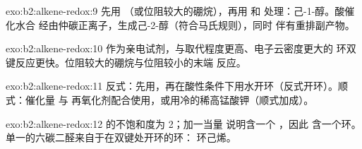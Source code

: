 \begin{solution}{exo:b2:alkene-redox:9}
先用 （或位阻较大的硼烷），再用  和  处理：己-1-醇。酸催化水合
经由仲碳正离子，生成己-2-醇（符合马氏规则），同时
伴有重排副产物。
\end{solution}

\begin{solution}{exo:b2:alkene-redox:10}
作为亲电试剂，与取代程度更高、电子云密度更大的
环双键反应更快。位阻较大的硼烷与位阻较小的末端  反应。
\end{solution}

\begin{solution}{exo:b2:alkene-redox:11}
反式：先用，再在酸性条件下用水开环（反式开环）。顺式：催化量  与
再氧化剂配合使用，或用冷的稀高锰酸钾（顺式加成）。
\end{solution}

\begin{solution}{exo:b2:alkene-redox:12}
 的不饱和度为 2；加一当量  说明含一个 ，因此
含一个环。单一的六碳二醛来自于在双键处开环的环：
环己烯。
\end{solution}

